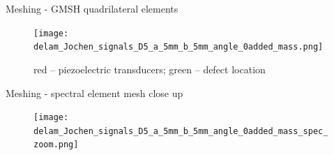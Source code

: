 \documentclass[10pt]{beamer} %
\begin{document}
\begin{frame}[b]{Meshing - GMSH quadrilateral elements}
	\begin{figure}
		\centering
		\texttt{[image: delam\_Jochen\_signals\_D5\_a\_5mm\_b\_5mm\_angle\_0added\_mass.png]}		
		\caption{red -- piezoelectric transducers; green -- defect location}
		\label{fig:quad_mesh}
	\end{figure}	
\end{frame}
\begin{frame}[t]{Meshing - spectral element mesh close up}
	\begin{figure}
		\centering
		\texttt{[image: delam\_Jochen\_signals\_D5\_a\_5mm\_b\_5mm\_angle\_0added\_mass\_spec\_zoom.png]}	
		\label{fig:spec_mesh_zoom}
	\end{figure}	
\end{frame}
\end{document}
